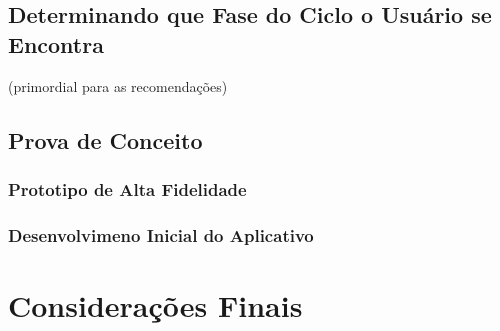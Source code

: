 \subsection{Determinando que Fase do Ciclo o Usuário se Encontra}
(primordial para as recomendações)

\subsection{Prova de Conceito}

\subsubsection{Prototipo de Alta Fidelidade}


\subsubsection{Desenvolvimeno Inicial do Aplicativo}


\section{Considerações Finais}
